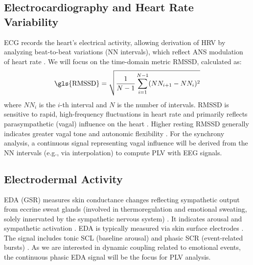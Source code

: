 \documentclass[12pt]{article} %
\begin{document}
\subsection{Electrocardiography and Heart Rate Variability} %
\gls{ECG} records the heart's electrical activity, allowing derivation of \gls{HRV} by analyzing beat-to-beat variations (\gls{NN intervals}), which reflect \gls{ANS} modulation of heart rate \parencite{malikHeartRateVariability1996, berntsonHeartRateVariability1997}. We will focus on the time-domain metric \gls{RMSSD}, calculated as:
\begin{equation} %
    \text{\gls{RMSSD}} = \sqrt{\frac{1}{N-1} \sum_{i=1}^{N-1} (NN_{i+1} - NN_i)^2}
    \label{eq:rmssd} %
\end{equation}
where $NN_i$ is the $i$-th interval and $N$ is the number of intervals. \gls{RMSSD} is sensitive to rapid, high-frequency fluctuations in heart rate and primarily reflects parasympathetic (vagal) influence on the heart \parencite{malikHeartRateVariability1996, shafferOverviewHeartRate2017}. Higher resting \gls{RMSSD} generally indicates greater vagal tone and autonomic flexibility \parencite{thayerRelationshipAutonomicImbalance2010}. For the synchrony analysis, a continuous signal representing vagal influence will be derived from the \gls{NN intervals} (e.g., via interpolation) to compute \gls{PLV} with \gls{EEG} signals.

\subsection{Electrodermal Activity} %
\gls{EDA} (\gls{GSR}) measures skin conductance changes reflecting sympathetic output from eccrine sweat glands (involved in thermoregulation and emotional sweating, solely innervated by the sympathetic nervous system) \parencite{dawsonElectrodermalSystem2007, boucseinElectrodermalActivity2012}. It indicates arousal and sympathetic activation \parencite{kreibigAutonomicNervousSystem2010}. \gls{EDA} is typically measured via skin surface electrodes \parencite{boucseinElectrodermalActivity2012}. The signal includes tonic \gls{SCL} (baseline arousal) and phasic \gls{SCR} (event-related bursts) \parencite{dawsonElectrodermalSystem2007}. As we are interested in dynamic coupling related to emotional events, the continuous phasic \gls{EDA} signal will be the focus for \gls{PLV} analysis.
\end{document}
